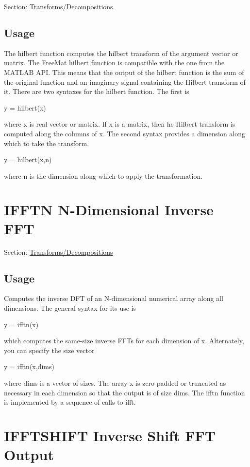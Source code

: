 Section\-: \hyperlink{sec_transforms}{Transforms/\-Decompositions} \hypertarget{vtkwidgets_vtkxyplotwidget_Usage}{}\subsection{Usage}\label{vtkwidgets_vtkxyplotwidget_Usage}
The {\ttfamily hilbert} function computes the hilbert transform of the argument vector or matrix. The Free\-Mat {\ttfamily hilbert} function is compatible with the one from the M\-A\-T\-L\-A\-B A\-P\-I. This means that the output of the {\ttfamily hilbert} function is the sum of the original function and an imaginary signal containing the Hilbert transform of it. There are two syntaxes for the hilbert function. The first is \begin{DoxyVerb}  y = hilbert(x)
\end{DoxyVerb}
 where {\ttfamily x} is real vector or matrix. If {\ttfamily x} is a matrix, then he Hilbert transform is computed along the columns of {\ttfamily x}. The second syntax provides a dimension along which to take the transform. \begin{DoxyVerb}  y = hilbert(x,n)
\end{DoxyVerb}
 where {\ttfamily n} is the dimension along which to apply the transformation. \hypertarget{transforms_ifftn}{}\section{I\-F\-F\-T\-N N-\/\-Dimensional Inverse F\-F\-T}\label{transforms_ifftn}
Section\-: \hyperlink{sec_transforms}{Transforms/\-Decompositions} \hypertarget{vtkwidgets_vtkxyplotwidget_Usage}{}\subsection{Usage}\label{vtkwidgets_vtkxyplotwidget_Usage}
Computes the inverse D\-F\-T of an N-\/dimensional numerical array along all dimensions. The general syntax for its use is \begin{DoxyVerb}  y = ifftn(x)
\end{DoxyVerb}
 which computes the same-\/size inverse F\-F\-Ts for each dimension of {\ttfamily x}. Alternately, you can specify the size vector \begin{DoxyVerb}  y = ifftn(x,dims)
\end{DoxyVerb}
 where {\ttfamily dims} is a vector of sizes. The array {\ttfamily x} is zero padded or truncated as necessary in each dimension so that the output is of size {\ttfamily dims}. The {\ttfamily ifftn} function is implemented by a sequence of calls to {\ttfamily ifft}. \hypertarget{transforms_ifftshift}{}\section{I\-F\-F\-T\-S\-H\-I\-F\-T Inverse Shift F\-F\-T Output}\label{transforms_ifftshift}
